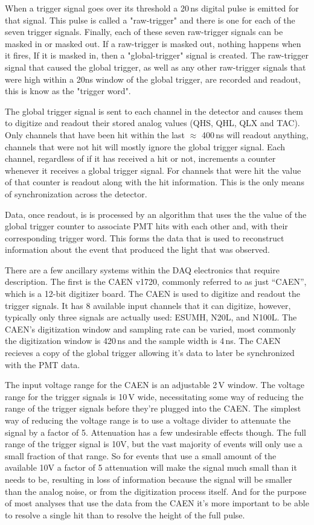 When a trigger signal goes over its threshold a 20\,ns digital pulse is
emitted for that signal. This pulse is called a "raw-trigger" and there is
one for each of the seven trigger signals.
Finally, each of these seven raw-trigger signals can be masked in or masked out.
If a raw-trigger is masked out, nothing happens when it fires,
If it is masked in, then a "global-trigger" signal is created.
The raw-trigger signal that caused the global trigger, as well as any other
raw-trigger signals that were high within a 20ns window of the global trigger,
are recorded and readout, this is know as the "trigger word".

The global trigger signal is sent to each channel in the detector and
causes them to digitize and readout their stored analog values (QHS, QHL, QLX and TAC).
Only channels that have been hit within the last $\approx$ 400\,ns will readout
anything, channels that were not hit will mostly ignore the global trigger signal.
Each channel, regardless of if it has received a hit or not, increments
a counter whenever it receives a global trigger signal.
For channels that were hit the value of that counter is readout
along with the hit information.
This is the only means of synchronization across the detector.

Data, once readout, is is processed by an algorithm that uses the
the value of the global trigger counter to associate PMT hits with
each other and, with their corresponding trigger word. 
This forms the data that is used to reconstruct information
about the event that produced the light that was observed.

There are a few ancillary systems within the DAQ electronics
that require description. The first is the CAEN v1720, commonly
referred to as just ``CAEN'', which is a 12-bit digitizer board.
The CAEN is used to digitize and readout the trigger signals.
It has 8 available input channels that it can digitize, however,
typically only three signals are actually used: ESUMH, N20L, and
N100L. The CAEN's digitization window and sampling rate can be varied,
most commonly the digitization window is 420\,ns and the sample width
is 4\,ns. The CAEN recieves a copy of the global trigger allowing it's
data to later be synchronized with the PMT data.

The input voltage range for the CAEN is an adjustable 2\,V window.
The voltage range for the trigger signals is 10\,V wide,
necessitating some way of reducing the range of the trigger signals
before they're plugged into the CAEN.
The simplest way of reducing the voltage range is to use a voltage
divider to attenuate the signal by a factor of 5.
Attenuation has a few undesirable effects though.
The full range of the trigger signal is 10V, but the vast
majority of events will only use a small fraction of that range.
So for events that use a small amount of the available 10V a factor
of 5 attenuation will make the signal much small than it needs to be,
resulting in loss of information because the signal will be smaller than
the analog noise, or from the digitization process itself.
And for the purpose of most analyses that use the data from the CAEN
it's more important to be able to resolve a single hit than to resolve
the height of the full pulse.

